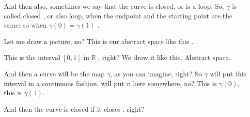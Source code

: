 \begin{speech}[00:32:57 - 00:34:27]
And then also, sometimes we say that the curve is closed, or is a loop. So, $\gamma$ is called closed , or also loop, when the endpoint and the starting point are the same: so when $\gamma(0) = \gamma(1)$ .

Let me draw a picture, no? This is our abstract space like this .

This is the interval $[0, 1]$ in $\mathbb{R}$ , right? We draw it like this. Abstract space.

And then a curve will be the map $\gamma$, as you can imagine, right? So $\gamma$ will put this interval in a continuous fashion, will put it here somewhere, no?  This is $\gamma(0)$, this is $\gamma(1)$.

And then the curve is closed if it closes , right?
\end{speech}

